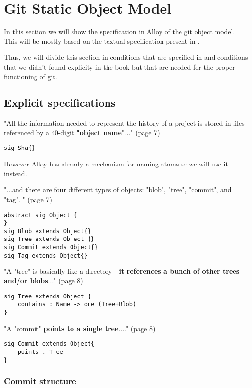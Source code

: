 \section{Git Static Object Model}

In this section we will show the specification in Alloy of the
git object model. This will be mostly based on the textual
specification present in \cite{gitComm}. \par
Thus, we will divide this section in conditions that are specified 
in \cite{gitComm} and conditions that we didn't found explicity
in the book but that are needed for the proper functioning of
git.

\subsection{Explicit specifications}

"All the information needed to represent the history
of a project is stored in files referenced by a 
40-digit {\bf "object name"}..." (page 7)

\begin{lstlisting}
sig Sha{}
\end{lstlisting}
However Alloy has already a mechanism for naming atoms se we will
use it instead.

"...and there are four different types of objects: "blob",
"tree", "commit", and "tag". " (page 7)

\begin{lstlisting}
abstract sig Object {
}
sig Blob extends Object{}
sig Tree extends Object {}
sig Commit extends Object{}
sig Tag extends Object{}
\end{lstlisting}

"A "tree" is basically like a directory - {\bf it references a bunch
of other trees and/or blobs}..." (page 8)

\begin{lstlisting}
sig Tree extends Object {
	contains : Name -> one (Tree+Blob)
}
\end{lstlisting}

"A "commit" {\bf points to a single tree}...." (page 8)

\begin{lstlisting}
sig Commit extends Object{
	points : Tree
}
\end{lstlisting}


\subsubsection{Commit structure}


